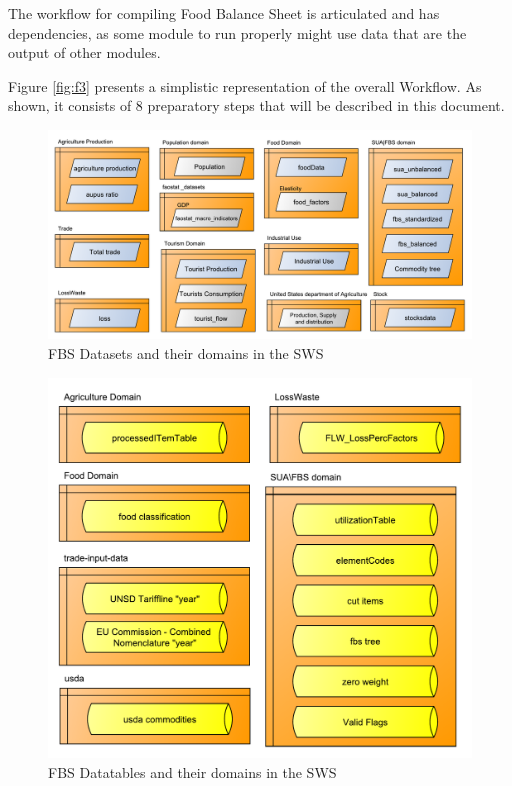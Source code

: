 \documentclass[]{article}
\begin{document}
The workflow for compiling Food Balance Sheet is articulated and has
dependencies, as some module to run properly might use data that are the
output of other modules.

Figure \ref{fig:f3} presents a simplistic representation of the overall
Workflow. As shown, it consists of 8 preparatory steps that will be
described in this document.

\begin{figure}[H]

{\centering \includegraphics{images/SwsFbs/02_DatasetsDomains} 

}

\caption{\label{fig:f2}FBS Datasets and their domains in the SWS}\label{fig:f2}
\end{figure}

\begin{figure}[H]

{\centering \includegraphics[width=0.6\linewidth]{images/SwsFbs/04_DataTablesDomains} 

}

\caption{\label{fig:f4}FBS Datatables and their domains in the SWS}\label{fig:f4}
\end{figure}
\end{document}
